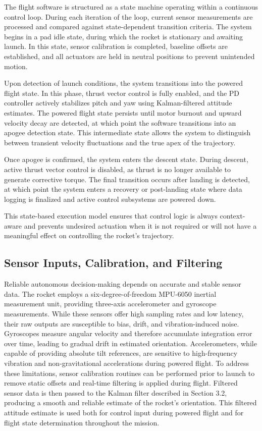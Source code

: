 The flight software is structured as a state machine operating within a continuous control loop. During each iteration of the loop, current sensor measurements are processed and compared against state-dependent transition criteria. The system begins in a pad idle state, during which the rocket is stationary and awaiting launch. In this state, sensor calibration is completed, baseline offsets are established, and all actuators are held in neutral positions to prevent unintended motion.

Upon detection of launch conditions, the system transitions into the powered flight state. In this phase, thrust vector control is fully enabled, and the PD controller actively stabilizes pitch and yaw using Kalman-filtered attitude estimates. The powered flight state persists until motor burnout and upward velocity decay are detected, at which point the software transitions into an apogee detection state. This intermediate state allows the system to distinguish between transient velocity fluctuations and the true apex of the trajectory.

Once apogee is confirmed, the system enters the descent state. During descent, active thrust vector control is disabled, as thrust is no longer available to generate corrective torque. The final transition occurs after landing is detected, at which point the system enters a recovery or post-landing state where data logging is finalized and active control subsystems are powered down.

This state-based execution model ensures that control logic is always context-aware and prevents undesired actuation when it is not required or will not have a meaningful effect on controlling the rocket’s trajectory.



\subsection{Sensor Inputs, Calibration, and Filtering}
Reliable autonomous decision-making depends on accurate and stable sensor data. The rocket employs a six-degree-of-freedom MPU-6050 inertial measurement unit, providing three-axis accelerometer and gyroscope measurements. While these sensors offer high sampling rates and low latency, their raw outputs are susceptible to bias, drift, and vibration-induced noise. 
Gyroscopes measure angular velocity and therefore accumulate integration error over time, leading to gradual drift in estimated orientation. Accelerometers, while capable of providing absolute tilt references, are sensitive to high-frequency vibration and non-gravitational accelerations during powered flight. To address these limitations, sensor calibration routines can be performed prior to launch to remove static offsets and real-time filtering is applied during flight.
Filtered sensor data is then passed to the Kalman filter described in Section 3.2, producing a smooth and reliable estimate of the rocket’s orientation. This filtered attitude estimate is used both for control input during powered flight and for flight state determination throughout the mission.





